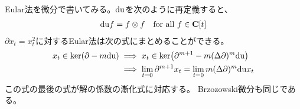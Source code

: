 {	Eular法を微分で書いてみる。${\operatorname{du}}$を次のように再定義すると、
	\begin{equation*}\begin{split}
		{\ensuremath{\operatorname{du}}}f = f\otimes f \quad\text{for all } f\in\mathbf{C}[t]
	\end{split}\end{equation*}
	$\partial x_t=x_t^2$に対するEular法は次の式にまとめることができる。
	\begin{equation*}\begin{split}
		x_t\in\ker(\partial - m{\operatorname{du}})
		&\implies x_t\in\ker\bigl(
			\partial^{m+1} - m(\Delta\partial)^m{\operatorname{du}}\bigr) \\
		&\implies \lim_{t=0}\partial^{m+1}x_t 
			= \lim_{t=0}m(\Delta\partial)^m{\operatorname{du}}x_t \\
	\end{split}\end{equation*}
	この式の最後の式が解の係数の漸化式に対応する。
	Brzozowski微分も同じである。

}

